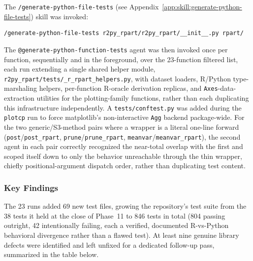 \documentclass[12pt]{article}
\newcommand{\skillapp}[2]{\texttt{/#1} (see Appendix~\ref{app:skill:#2})}
\begin{document}
The \skillapp{generate-python-file-tests}{generate-python-file-tests} skill was invoked:
\begin{lstlisting}[style=skill]
/generate-python-file-tests r2py_rpart/r2py_rpart/__init__.py rpart/
\end{lstlisting}
The \texttt{@generate-python-function-tests} agent was then invoked once per function, sequentially and in the foreground, over the 23-function filtered list, each run extending a single shared helper module, \texttt{r2py\_rpart/tests/\_r\_rpart\_helpers.py}, with dataset loaders, R/Python type-marshaling helpers, per-function R-oracle derivation replicas, and \texttt{Axes}-data-extraction utilities for the plotting-family functions, rather than each duplicating this infrastructure independently. A \texttt{tests/conftest.py} was added during the \texttt{plotcp} run to force matplotlib's non-interactive \texttt{Agg} backend package-wide. For the two generic/S3-method pairs where a wrapper is a literal one-line forward (\texttt{post}/\texttt{post\_rpart}, \texttt{prune}/\texttt{prune\_rpart}, \texttt{meanvar}/\texttt{meanvar\_rpart}), the second agent in each pair correctly recognized the near-total overlap with the first and scoped itself down to only the behavior unreachable through the thin wrapper, chiefly positional-argument dispatch order, rather than duplicating test content.

\subsubsection{Key Findings}

The 23 runs added 69 new test files, growing the repository's test suite from the 38 tests it held at the close of Phase~11 to 846 tests in total (804 passing outright, 42 intentionally failing, each a verified, documented R-vs-Python behavioral divergence rather than a flawed test). At least nine genuine library defects were identified and left unfixed for a dedicated follow-up pass, summarized in the table below.
\end{document}

